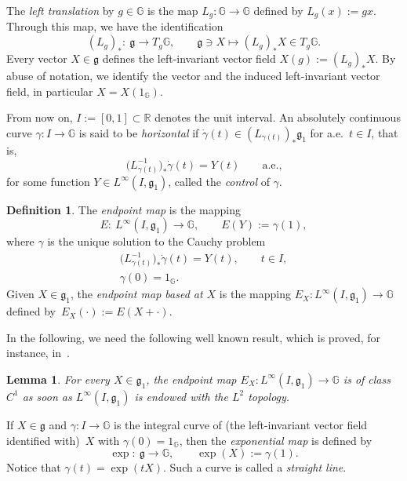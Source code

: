 \documentclass[pdftex]{sigma}
\numberwithin{equation}{section}
\newtheorem{Lemma}[Theorem]{Lemma}
\theoremstyle{definition}
\newtheorem{Definition}[Theorem]{Definition}
\begin{document}
The \emph{left translation} by $g\in \mathbb{G}$ is the map $L_g\colon \mathbb{G}\to\mathbb{G}$ defined by $L_g(x):=gx$. Through this map, we have the identification
\begin{equation*}
 (L_g)_*\colon \ {\mathfrak g}\to T_g\mathbb{G}, \qquad {\mathfrak g}\ni X\mapsto (L_g)_*X\in T_g\mathbb{G}.
\end{equation*}
Every vector $X\in{\mathfrak g}$ defines the left-invariant vector field $X(g):=(L_g)_*X$. By abuse of notation, we identify the vector and the induced left-invariant vector field, in particular $X=X(1_\mathbb{G})$.

From now on, $I:=[0,1]\subset\mathbb{R}$ denotes the unit interval.
An absolutely continuous curve $\gamma\colon I\to\mathbb{G}$ is said to be \emph{horizontal} if
$\dot\gamma(t)\in (L_{\gamma(t)})_*{\mathfrak g}_1$
 for a.e.\ $t\in I$, that is,
\begin{equation*}
 \bigl(L_{\gamma(t)}^{-1}\bigr)_*
 \dot\gamma(t)=Y(t)\qquad\mbox{a.e.,}
\end{equation*}
for some function $Y\in L^\infty(I,{\mathfrak g}_1)$, called the \emph{control} of $\gamma$.
\begin{Definition}
\label{def:endpoint}
The \emph{endpoint map} is the mapping
 \begin{equation*}
 E\colon \ L^\infty(I,{\mathfrak g}_1)\to\mathbb{G}, \qquad E(Y):=\gamma(1),
 \end{equation*}
 where $\gamma$ is the unique solution to the Cauchy problem
 \begin{gather*}
 \bigl(L_{\gamma(t)}^{-1}\bigr)_* \dot\gamma(t)=Y(t),\qquad t\in I,\\
 \gamma(0)=1_\mathbb{G}.
 \end{gather*}
Given $X\in{\mathfrak g}_1$, the \emph{endpoint map based at $X$} is the mapping $E_X\colon L^\infty(I,{\mathfrak g}_1)\to \mathbb{G}$ defined by~${E_X(\cdot):=E(X+\cdot)}$.
\end{Definition}

In the following, we need the following well known result, which is proved, for instance, in~\cite[Section~8]{ABB20}.

\begin{Lemma}
 For every $X\in{\mathfrak g}_1$, the endpoint map $E_X\colon L^\infty(I,{\mathfrak g}_1)\to\mathbb{G}$ is of class $C^1$ as soon as $L^\infty(I,{\mathfrak g}_1)$ is endowed with the $L^2$ topology.
\end{Lemma}

If $X\in{\mathfrak g}$ and $\gamma\colon I \to\mathbb{G}$ is the integral curve of (the left-invariant vector field identified with)~$X$ with $\gamma(0)=1_\mathbb{G}$, then the {\em exponential map} is defined by
\begin{equation*}
 \exp\colon\ {\mathfrak g}\to\mathbb{G}, \qquad \exp(X):=\gamma(1).
\end{equation*}
Notice that $\gamma(t)=\exp(tX)$. Such a curve is called a {\em straight line}.
\end{document}
